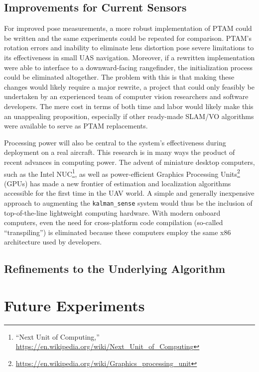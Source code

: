 \subsection{Improvements for Current Sensors}

For improved pose measurements, a more robust implementation of PTAM could be written and the same experiments could be repeated for comparison. PTAM's rotation errors and inability to eliminate lens distortion pose severe limitations to its effectiveness in small UAS navigation. Moreover, if a rewritten implementation were able to interface to a downward-facing rangefinder, the initialization process could be eliminated altogether. The problem with this is that making these changes would likely require a major rewrite, a project that could only feasibly be undertaken by an experienced team of computer vision researchers and software developers. The mere cost in terms of both time and labor would likely make this an unappealing proposition, especially if other ready-made SLAM/VO algorithms were available to serve as PTAM replacements.

Processing power will also be central to the system's effectiveness during deployment on a real aircraft. This research is in many ways the product of recent advances in computing power. The advent of miniature desktop computers, such as the Intel NUC\footnote{``Next Unit of Computing,'' \url{https://en.wikipedia.org/wiki/Next_Unit_of_Computing}}, as well as power-efficient Graphics Processing Units\footnote{\url{https://en.wikipedia.org/wiki/Graphics_processing_unit}} (GPUs) has made a new frontier of estimation and localization algorithms accessible for the first time in the UAV world. A simple and generally inexpensive approach to augmenting the \texttt{kalman\_sense} system would thus be the inclusion of top-of-the-line lightweight computing hardware. With modern onboard computers, even the need for cross-platform code compilation (so-called ``transpiling'') is eliminated because these computers employ the same x86 architecture used by developers.

\subsection{Refinements to the Underlying Algorithm}





\section{Future Experiments}

